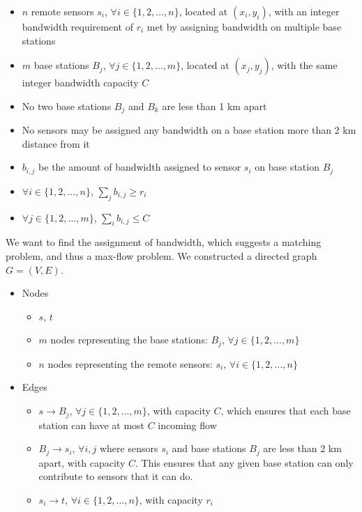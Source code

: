 \begin{itemize}
\item $n$ remote sensors $s_i$, $\forall i \in \{1, 2, \dots, n\}$, located at $(x_i, y_i)$, with an integer bandwidth requirement of $r_i$ met by assigning bandwidth on multiple base stations
\item $m$ base stations $B_j$, $\forall j \in \{1, 2, \dots, m\}$, located at $(x_j, y_j)$, with the same integer bandwidth capacity $C$
\item No two base stations $B_j$ and $B_k$ are less than 1 km apart
\item No sensors may be assigned any bandwidth on a base station more than 2 km distance from it
\item $b_{i,j}$ be the amount of bandwidth assigned to sensor $s_i$ on base station $B_j$
\item $\forall i \in \{1, 2, \dots, n\}$, $\sum_j b_{i,j} \ge r_i$
\item $\forall j \in \{1, 2, \dots, m\}$, $\sum_i b_{i,j} \le C$
\end{itemize}

We want to find the assignment of bandwidth, which suggests a matching problem, and thus a max-flow problem. We constructed a directed graph $G=(V,E)$.

\begin{itemize}
\item Nodes
	\begin{itemize}
		\item $s$, $t$
		\item $m$ nodes representing the base stations: $B_j$, $\forall j \in \{1, 2, \dots, m\}$
		\item $n$ nodes representing the remote sensors: $s_i$, $\forall i \in \{1, 2, \dots, n\}$
	\end{itemize}
\item Edges
	\begin{itemize}
		\item $s \rightarrow B_{j}$, $\forall j \in \{1, 2, \dots, m\}$, with capacity $C$, which ensures that each base station can have at most $C$ incoming flow
		\item $B_{j} \rightarrow s_i$, $\forall i, j$ where sensors $s_i$ and base stations $B_j$ are less than 2 km apart, with capacity $C$. This ensures that any given base station can only contribute to sensors that it can do.
		\item $s_i \rightarrow t$, $\forall i \in \{1, 2, \dots, n\}$, with capacity $r_{i}$
	\end{itemize}
\end{itemize}

